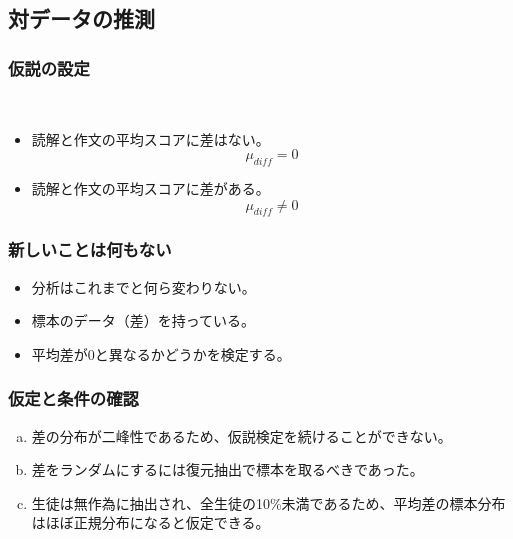 
\subsection{対データの推測}

\begin{frame}
\frametitle{仮説の設定}



$\:$ \\


\begin{itemize}
\item[$H_0$:] 読解と作文の平均スコアに差はない。
\[ \mu_{diff} = 0 \]
\item[$H_A$:] 読解と作文の平均スコアに差がある。
\[ \mu_{diff} \ne 0 \]
\end{itemize}

\end{frame}


\begin{frame}
\frametitle{新しいことは何もない}

\begin{itemize}

\item 分析はこれまでと何ら変わりない。

\item {}標本のデータ（差）を持っている。

\item 平均差が0と異なるかどうかを検定する。

\end{itemize}

\end{frame}


\begin{frame}
\frametitle{仮定と条件の確認}


\begin{enumerate}[(a)]
\item 差の分布が二峰性であるため、仮説検定を続けることができない。
\item 差をランダムにするには復元抽出で標本を取るべきであった。
\item 生徒は無作為に抽出され、全生徒の10\%未満であるため、平均差の標本分布はほぼ正規分布になると仮定できる。
\end{enumerate}

\end{frame}


